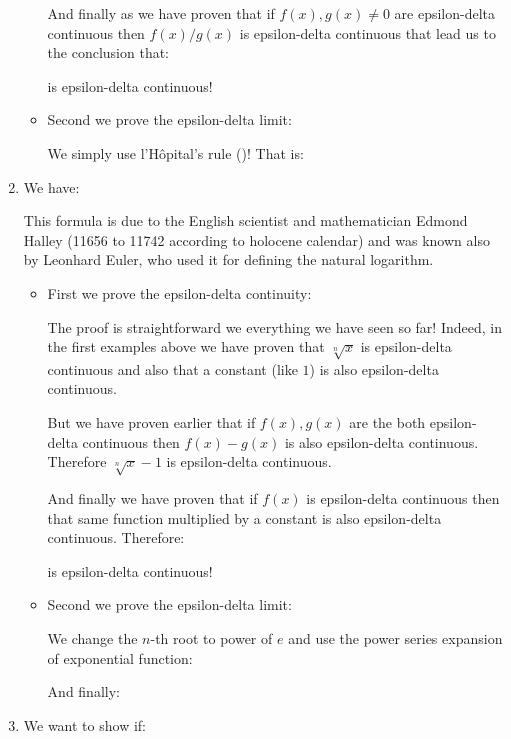 \begin{enumerate}
\begin{itemize}
			And finally as we have proven that if $f(x),g(x)\neq 0$ are epsilon-delta continuous then $f(x)/g(x)$ is epsilon-delta continuous that lead us to the conclusion that:
			
			is epsilon-delta continuous!
			
			\item Second we prove the epsilon-delta limit:
			
			We simply use l'Hôpital's rule ()! That is:
			
		\end{itemize}
		
		\item We have:
		
		This formula is due to the English scientist and mathematician Edmond Halley (11656 to 11742 according to holocene calendar) and was known also by Leonhard Euler, who used it for defining the natural logarithm.
		
		\begin{itemize}
			\item First we prove the epsilon-delta continuity:
			
			The proof is straightforward we everything we have seen so far! Indeed, in the first examples above we have proven that $\sqrt[n]{x}$ is epsilon-delta continuous and also that a constant (like $1$) is also epsilon-delta continuous.
			
			But we have proven earlier that if $f(x),g(x)$ are the both epsilon-delta continuous then $f(x)-g(x)$ is also epsilon-delta continuous. Therefore $\sqrt[n]{x}-1$ is epsilon-delta continuous.
			
			And finally we have proven that if $f(x)$ is epsilon-delta continuous then that same function multiplied by a constant is also epsilon-delta continuous. Therefore:
			
			is epsilon-delta continuous!
			
			\item Second we prove the epsilon-delta limit:
			
			We change the $n$-th root to power of $e$ and use the power series expansion of exponential function:
			
			And finally:
			
		\end{itemize}
		
		\item We want to show if:
		

\end{enumerate}
